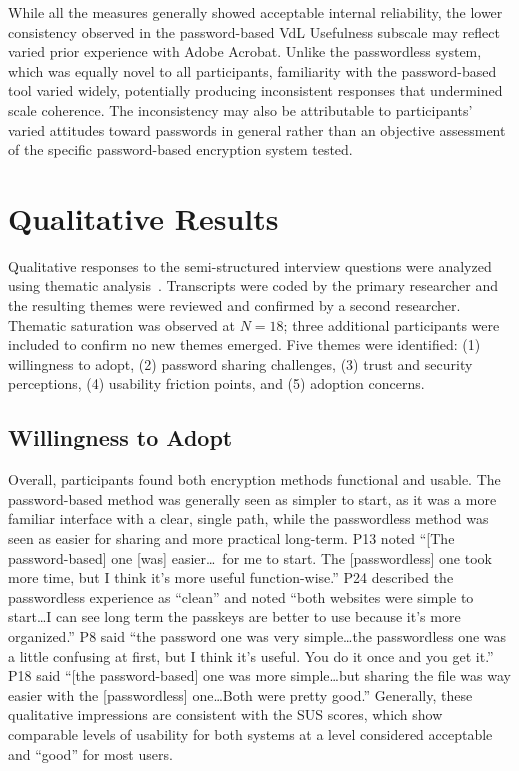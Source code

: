 

While all the measures generally showed acceptable internal reliability, the lower consistency observed in the password-based VdL Usefulness subscale may reflect varied prior experience with Adobe Acrobat. Unlike the passwordless system, which was equally novel to all participants, familiarity with the password-based tool varied widely, potentially producing inconsistent responses that undermined scale coherence. The inconsistency may also be attributable to participants' varied attitudes toward passwords in general rather than an objective assessment of the specific password-based encryption system tested.

\section{Qualitative Results}
\label{sec:qualitative-results}

Qualitative responses to the semi-structured interview questions were analyzed using thematic analysis~\cite{braun_thematic_2006}. Transcripts were coded by the primary researcher and the resulting themes were reviewed and confirmed by a second researcher. Thematic saturation was observed at $N=18$; three additional participants were included to confirm no new themes emerged. Five themes were identified: (1) willingness to adopt, (2) password sharing challenges, (3) trust and security perceptions, (4) usability friction points, and (5) adoption concerns.

\subsection{Willingness to Adopt}
\label{sec:willingness-to-adopt}

Overall, participants found both encryption methods functional and usable. The password-based method was generally seen as simpler to start, as it was a more familiar interface with a clear, single path, while the passwordless method was seen as easier for sharing and more practical long-term. P13 noted ``[The password-based] one [was] easier\ldots\ for me to start. The [passwordless] one took more time, but I think it's more useful function-wise.'' P24 described the passwordless experience as ``clean'' and noted ``both websites were simple to start\ldots I can see long term the passkeys are better to use because it's more organized.'' P8 said ``the password one was very simple\ldots the passwordless one was a little confusing at first, but I think it's useful. You do it once and you get it.'' P18 said ``[the password-based] one was more simple\ldots but sharing the file was way easier with the [passwordless] one\ldots Both were pretty good.'' Generally, these qualitative impressions are consistent with the SUS scores, which show comparable levels of usability for both systems at a level considered acceptable and ``good'' for most users.

